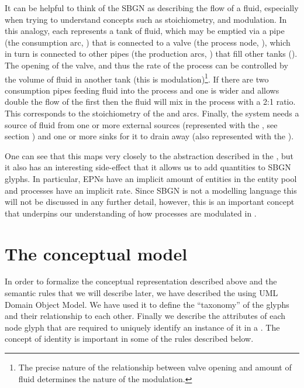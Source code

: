 It can be helpful to think of the SBGN \PD as describing the flow of a fluid, especially when trying to understand concepts such as stoichiometry, and modulation. In this analogy, each  represents a tank of fluid, which may be emptied via a pipe (the consumption arc, ) that is connected to a valve (the process node, ), which in turn is connected to other pipes (the production arcs, ) that fill other tanks (). The opening of the valve, and thus the rate of the process can be controlled by the volume of fluid in another tank (this is modulation)\footnote{The precise nature of the relationship between valve opening and amount of fluid determines the nature of the modulation.}. If there are two consumption pipes feeding fluid into the process and one is wider and allows double the flow of the first then the fluid will mix in the process with a 2:1 ratio. This corresponds to the stoichiometry of the  and  arcs. Finally, the system needs a source of fluid from one or more external sources (represented with the , see section ) and one or more sinks for it to drain away (also represented with the ).

One can see that this maps very closely to the abstraction described in the \PDl, but it also has an interesting side-effect that it allows us to add quantities to SBGN glyphs. In particular, EPNs have an implicit amount of entities in the entity pool and processes have an implicit rate. Since SBGN \PD is not a modelling language this will not be discussed in any further detail, however, this is an important concept that underpins our understanding of how processes are modulated in .

\section{The conceptual model}
\label{sec:conceptual-model}

In order to formalize the conceptual representation described above and the semantic rules that we will describe later, we have described the \PDl using UML Domain Object Model. We have used it to define the ``taxonomy'' of the \PD glyphs and their relationship to each other. Finally we describe the attributes of each node glyph that are required to uniquely identify an instance of it in a \PDm. The concept of identity is important in some of the rules described below.

